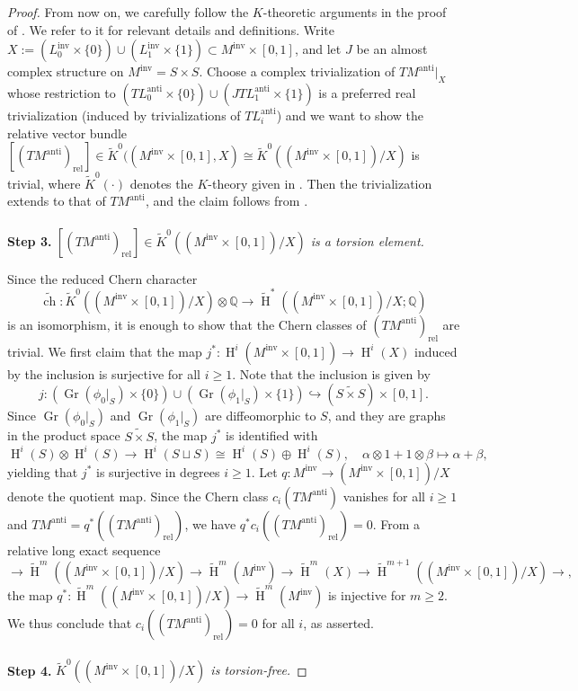 \documentclass[12pt]{article}
\renewcommand{\ge}{\geqslant}
\theoremstyle{theorem}
\theoremstyle{definition}
\theoremstyle{remark}
\numberwithin{equation}{section}
\newcommand{\Q}{{\mathbb{Q}}}
\DeclareMathOperator{\anti}{anti}
\DeclareMathOperator{\inv}{inv}
\DeclareMathOperator{\rel}{rel}
\DeclareMathOperator{\ch}{ch}
\DeclareMathOperator{\Gr}{Gr}
\DeclareMathOperator{\Ho}{H}
\begin{document}
\begin{proof}
From now on, we carefully follow the $K$-theoretic arguments in the proof of \cite[Theorem~3.11]{He12}.
We refer to it for relevant details and definitions.
Write $X:= (L_0^{\inv}\times \{0\})\cup (L_1^{\inv}\times \{1\})\subset M^{\inv}\times [0,1]$, and let $J$ be an almost complex structure on $M^{\inv}=S\times S$.
Choose a complex trivialization of $TM^{\anti}|_X$ whose restriction to $(TL_0^{\anti}\times \{0\}) \cup (JTL_1^{\anti}\times \{1\})$ is a preferred real trivialization (induced by trivializations of $TL_i^{\anti}$) and we want to show the relative vector bundle $[(TM^{\anti})_{\rel}]\in \widetilde{K}^0((M^{\inv}\times [0,1],X)\cong \widetilde{K}^0((M^{\inv}\times [0,1])/X)$ is trivial, where $\widetilde{K}^0(\cdot)$ denotes the $K$-theory given in \cite[Section~6]{He12}.
Then the trivialization extends to that of $TM^{\anti}$, and the claim follows from \cite[Proposition~7.1]{He12}.\\\\
{\bf Step 3.} \emph{$[(TM^{\anti})_{\rel}]\in \widetilde{K}^0((M^{\inv}\times [0,1])/X)$ is a torsion element.}

Since the reduced Chern character
$$
\widetilde{\ch}\colon \widetilde{K}^0((M^{\inv}\times [0,1])/X)\otimes \Q \to \widetilde{\Ho}^*((M^{\inv}\times [0,1])/X;\Q)
$$
is an isomorphism, it is enough to show that the Chern classes of $(TM^{\anti})_{\rel}$ are trivial.
We first claim that the map $j^*\colon \Ho^i(M^{\inv}\times [0,1])\to \Ho^i(X)$ induced by the inclusion is surjective for all $i\ge 1$.
Note that the inclusion is given by
$$
j\colon (\Gr(\phi_0|_S)\times \{0\})\cup (\Gr(\phi_1|_S)\times \{1\}) \hookrightarrow (\widetilde{S\times S})\times [0,1].
$$
Since $\Gr(\phi_0|_S)$ and $\Gr(\phi_1|_S)$ are diffeomorphic to $S$, and they are graphs in the product space $\widetilde{S\times S}$, the map $j^*$ is identified with
$$
\Ho^i(S)\otimes \Ho^i(S) \to \Ho^i(S\sqcup S)\cong \Ho^i(S)\oplus \Ho^i(S),\quad \alpha\otimes 1 + 1\otimes \beta \mapsto \alpha + \beta,
$$
yielding that $j^*$ is surjective in degrees $i\ge 1$.
Let $q\colon M^{\inv}\to (M^{\inv}\times [0,1])/X$ denote the quotient map.
Since the Chern class $c_i(TM^{\anti})$ vanishes for all $i\ge 1$ and $TM^{\anti}=q^*((TM^{\anti})_{\rel})$, we have $q^*c_i((TM^{\anti})_{\rel})=0$.
From a relative long exact sequence
$$
\to \widetilde{\Ho}^m((M^{\inv}\times [0,1])/X)\to \widetilde{\Ho}^m(M^{\inv})\to \widetilde{\Ho}^m(X)\to \widetilde{\Ho}^{m+1}((M^{\inv}\times [0,1])/X)\to,
$$
the map $q^*\colon \widetilde{\Ho}^m((M^{\inv}\times [0,1])/X)\to \widetilde{\Ho}^m(M^{\inv})$ is injective for $m\ge 2$.
We thus conclude that $c_i((TM^{\anti})_{\rel})=0$ for all $i$, as asserted.\\\\
{\bf Step 4.} \emph{$\widetilde{K}^0((M^{\inv}\times [0,1])/X)$ is torsion-free.}


\end{proof}
\end{document}
